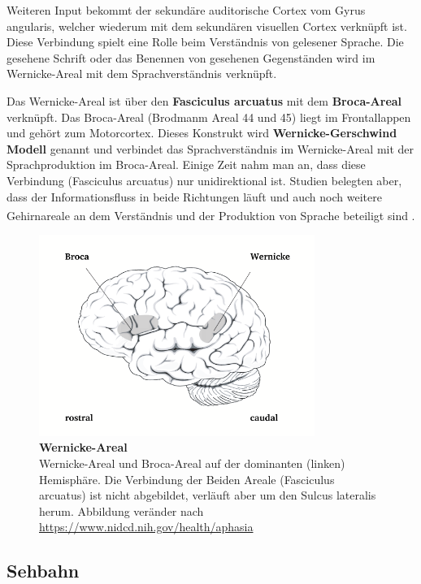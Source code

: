 \documentclass[12pt,a4paper,pdftex]{article}
\begin{document}
Weiteren Input bekommt der sekundäre auditorische Cortex vom Gyrus angularis, welcher wiederum mit dem sekundären visuellen Cortex verknüpft ist. Diese Verbindung spielt eine Rolle beim Verständnis von gelesener Sprache. Die gesehene Schrift oder das Benennen von gesehenen Gegenständen wird im Wernicke-Areal mit dem Sprachverständnis verknüpft. 

Das Wernicke-Areal ist über den \textbf{Fasciculus arcuatus}  mit dem \textbf{Broca-Areal}  verknüpft. Das Broca-Areal (Brodmanm Areal 44 und 45) liegt im Frontallappen und gehört zum Motorcortex. Dieses Konstrukt wird \textbf{Wernicke-Gerschwind Modell}  genannt und verbindet das Sprachverständnis im Wernicke-Areal mit der Sprachproduktion im Broca-Areal. Einige Zeit nahm man an, dass diese Verbindung (Fasciculus arcuatus) nur unidirektional ist. Studien belegten aber, dass der Informationsfluss in beide Richtungen läuft und auch noch weitere Gehirnareale an dem Verständnis und der Produktion von Sprache beteiligt sind \textsuperscript{\cite[60]{kandel2013principles}}.

\begin{figure}[H]
    \centering
    \includegraphics[width=0.8\textwidth]{pictures/auditory/Wernicke.png}
    \caption[Wernicke-Areal]{\textbf{Wernicke-Areal}\\ 
    Wernicke-Areal und Broca-Areal auf der dominanten (linken) Hemisphäre. Die Verbindung der Beiden Areale (Fasciculus arcuatus) ist nicht abgebildet, verläuft aber um den Sulcus lateralis herum.
    Abbildung veränder nach \url{https://www.nidcd.nih.gov/health/aphasia}}
    \label{fig:Wernicke}
\end{figure}

\newpage
\subsection{Sehbahn}
\end{document}
